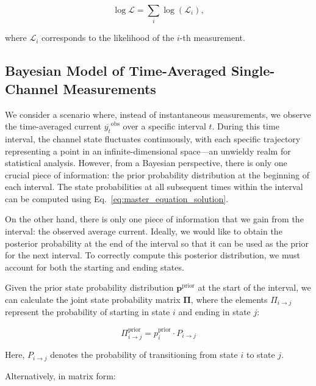 \documentclass[pdflatex,sn-mathphys-num]{sn-jnl}%
\theoremstyle{thmstyleone}%
\theoremstyle{thmstyletwo}%
\theoremstyle{thmstylethree}%
\begin{document}
\begin{equation}
	\log \mathcal{L} = \sum_i \log (\mathcal{L}_i),
	\label{eq:total_loglikelihood}
\end{equation}

where \( \mathcal{L}_i \) corresponds to the likelihood of the \( i \)-th measurement.


\subsection{Bayesian Model of Time-Averaged Single-Channel Measurements}

We consider a scenario where, instead of instantaneous measurements, we observe the time-averaged current \( \overline{y_t}^{\text{obs}} \) over a specific interval \( t \). During this time interval, the channel state fluctuates continuously, with each specific trajectory representing a point in an infinite-dimensional space—an unwieldy realm for statistical analysis. However, from a Bayesian perspective, there is only one crucial piece of information: the prior probability distribution at the beginning of each interval. The state probabilities at all subsequent times within the interval can be computed using Eq.~\ref{eq:master_equation_solution}. 

On the other hand, there is only one piece of information that we gain from the interval: the observed average current. Ideally, we would like to obtain the posterior probability at the end of the interval so that it can be used as the prior for the next interval. To correctly compute this posterior distribution, we must account for both the starting and ending states.

Given the prior state probability distribution \( \boldsymbol{p}^{\text{prior}} \) at the start of the interval, we can calculate the joint state probability matrix \( \boldsymbol{\Pi} \), where the elements \( \Pi_{i \rightarrow j} \) represent the probability of starting in state \( i \) and ending in state \( j \):

\begin{equation}
	\Pi_{i \rightarrow j}^{\text{prior}} = p^{\text{prior}}_i \cdot P_{i \rightarrow j}
	\label{eq:joint_state_probability}
\end{equation}

Here, \( P_{i \rightarrow j} \) denotes the probability of transitioning from state \( i \) to state \( j \).

Alternatively, in matrix form:
\end{document}
